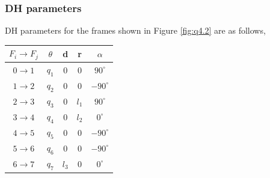 \documentclass[12pt]{article}
\begin{document}
\subsubsection*{DH parameters}
DH parameters for the frames shown in Figure \ref{fig:q4.2} are as follows,
\begin{center}
\begin{tabular}{ c | c c c c }
 \hline
 $F_i \to F_j$ & $\theta$ & d & r & $\alpha$ \\
 \hline
 $0 \to 1$ & $q_1$    & $0$       & $0$     &   $90^{\circ}$   \\
 $1 \to 2$ & $q_2$    & $0$       & $0$     &   $-90^{\circ}$  \\
 $2 \to 3$ & $q_3$    & $0$       & $l_1$   &   $90^{\circ}$   \\
 $3 \to 4$ & $q_4$    & $0$       & $l_2$   &   $0^{\circ}$   \\
 $4 \to 5$ & $q_5$    & $0$       & $0$     &   $-90^{\circ}$  \\
 $5 \to 6$ & $q_6$    & $0$       & $0$     &   $-90^{\circ}$   \\
 $6 \to 7$ & $q_7$    & $l_3$     & $0$     &   $0^{\circ}$    \\
 \hline
\end{tabular}
\end{center}
\end{document}
